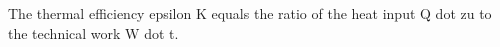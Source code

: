 The thermal efficiency epsilon K equals the ratio of the heat input Q dot zu to the technical work W dot t.